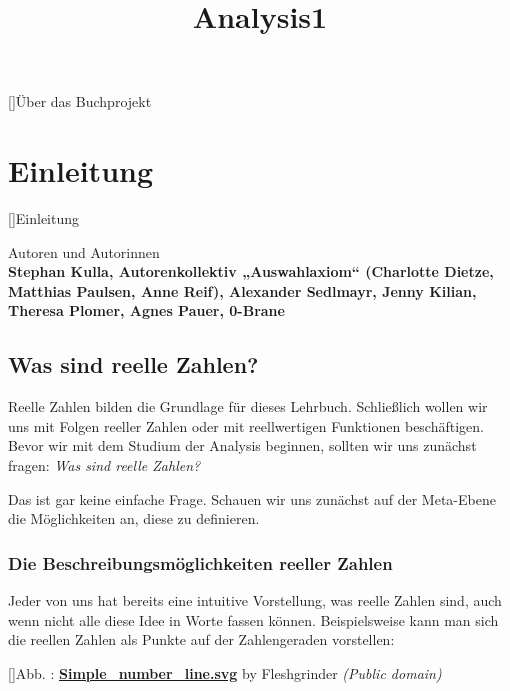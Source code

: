 \documentclass[fontsize=9pt,
               parskip=half-,
               DIV=14,
               listof=chapterentry,
               tocflat]{scrbook}
\title{Analysis1}
\date{}
\newcounter{imagelabel}
\newenvironment{authors}{\par\vspace*{\fill}\color{white}Autoren und
Autorinnen\\\bfseries}{\clearpage}
\newcommand{\ColoredTOC}{{\color{sblau}\setcounter{tocdepth}{0}\tableofcontents}}
\begin{document}
\sloppy

\clearpage%
\thispagestyle{empty}%
\null%
\clearpage



[]{Über das Buchprojekt}\ColoredTOC

\newpage

\part{Einleitung}

[]{Einleitung}\begin{authors}
Stephan Kulla, Autorenkollektiv „Auswahlaxiom“ (Charlotte Dietze, Matthias Paulsen, Anne Reif), Alexander Sedlmayr, Jenny Kilian, Theresa Plomer, Agnes Pauer, 0-Brane\end{authors}

\chapter{Was sind reelle Zahlen?}

Reelle Zahlen bilden die Grundlage für dieses Lehrbuch. Schließlich wollen wir uns mit Folgen reeller Zahlen oder mit reellwertigen Funktionen beschäftigen. Bevor wir mit dem Studium der Analysis beginnen, sollten wir uns zunächst fragen: \emph{Was sind reelle Zahlen?}

Das ist gar keine einfache Frage. Schauen wir uns zunächst auf der Meta-Ebene die Möglichkeiten an, diese zu definieren.

\section{Die Beschreibungsmöglichkeiten reeller Zahlen}

Jeder von uns hat bereits eine intuitive Vorstellung, was reelle Zahlen sind, auch wenn nicht alle diese Idee in Worte fassen können. Beispielsweise kann man sich die reellen Zahlen als Punkte auf der Zahlengeraden vorstellen:

[]{Abb. : \protect\href{https://commons.wikimedia.org/wiki/File:Simple_number_line.svg}{\textbf{Simple\allowbreak\_number\allowbreak\_line.svg}} by Fleshgrinder \textit{(Public domain)}}\begin{center}
\end{center}
\end{document}
